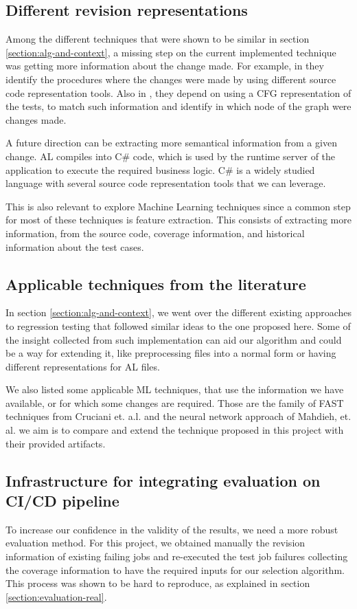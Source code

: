 \documentclass{article}
\begin{document}
\subsection{Different revision representations}
Among the different techniques that were shown to be similar in section \ref{section:alg-and-context}, a missing step on the current implemented technique was getting more information about the change made. For example, in \cite{6405252} they identify the procedures where the changes were made by using different source code representation tools. Also in \cite{962562}, they depend on using a CFG representation of the tests, to match such information and identify in which node of the graph were changes made.

A future direction can be extracting more semantical information from a given change. AL compiles into C\# code, which is used by the runtime server of the application to execute the required business logic. C\# is a widely studied language with several source code representation tools that we can leverage.

This is also relevant to explore Machine Learning techniques since a common step for most of these techniques is feature extraction. This consists of extracting more information, from the source code, coverage information, and historical information about the test cases.

\subsection{Applicable techniques from the literature}
In section \ref{section:alg-and-context}, we went over the different existing approaches to regression testing that followed similar ideas to the one proposed here. Some of the insight collected from such implementation can aid our algorithm and could be a way for extending it, like preprocessing files into a normal form or having different representations for AL files.

We also listed some applicable ML techniques, that use the information we have available, or for which some changes are required. Those are the family of FAST techniques from Cruciani et. a.l. and the neural network approach of Mahdieh, et. al. we aim is to compare and extend the technique proposed in this project with their provided artifacts.

\subsection{Infrastructure for integrating evaluation on CI/CD pipeline}
To increase our confidence in the validity of the results, we need a more robust evaluation method. For this project, we obtained manually the revision information of existing failing jobs and re-executed the test job failures collecting the coverage information to have the required inputs for our selection algorithm. This process was shown to be hard to reproduce, as explained in section \ref{section:evaluation-real}.
\end{document}
